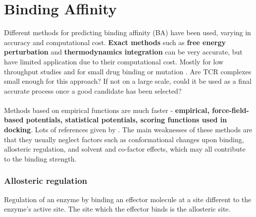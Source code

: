 	
	\flushbottom %
	
	\maketitle %

	\thispagestyle{empty} %

\section{Binding Affinity}

Different methods for predicting binding affinity (BA) have been used, varying in accuracy and computational cost. \textbf{Exact methods} such as \textbf{free energy perturbation} and \textbf{thermodynamics integration} can be very accurate, but have limited application due to their computational cost. Mostly for low throughput studies and for small drug binding or mutation \cite{Vangone2015}. Are TCR complexes small enough for this approach? If not on a large scale, could it be used as a final accurate process once a good candidate has been selected? 
\\
\\
Methods based on empirical functions are much faster - \textbf{empirical, force-field-based potentials, statistical potentials, scoring functions used in docking}. Lots of references given by \cite{Vangone2015}. The main weaknesses of these methods are that they usually neglect factors such as conformational changes upon binding, allosteric regulation, and solvent and co-factor effects, which may all contribute to the binding strength.

\subsubsection{Allosteric regulation}
Regulation of an enzyme by binding an effector molecule at a site different to the enzyme's active site. The site which the effector binds is the allosteric site.

	


	
	

	\printbibliography	
	
